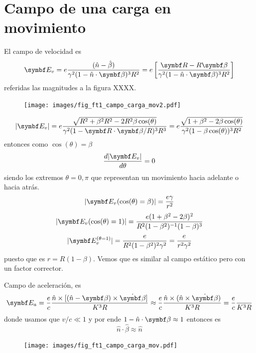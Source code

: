 \documentclass[10pt,oneside]{CBFT_book}
\begin{document}
\section{Campo de una carga en movimiento}

El campo de velocidad es 
\[
	\vb{E}_v = e \frac{(\hat{n}-\hat{\beta})}{\gamma^2(1-\hat{n}\cdot\vb{\beta})^3R^2} =
		e \left[ \frac{\vb{R}-R\vb{\beta}}{\gamma^2(1-\hat{n}\cdot\vb{\beta})^3R^2} \right]
\]
referidas las magnitudes a la figura XXXX.

\begin{figure}[htb]
	\begin{center}
	\texttt{[image: images/fig\_ft1\_campo\_carga\_mov2.pdf]}	 
	\end{center}
	\caption{}
\end{figure} 

\[
	|\vb{E}_v| = e\frac{\sqrt{ R^2 + \beta^2 R^2 - 2R^2 \beta \cos(\theta)}}
		{\gamma^2( 1 - \vb{R}\cdot\vb{\beta}/R)^3 R^3} =
		e\frac{\sqrt{ 1 + \beta^2 - 2 \beta \cos(\theta)}}
		{\gamma^2( 1 - \beta \cos(\theta))^3 R^2}
\]
entonces como $\cos(\theta) = \beta$
\[
	\dtot{ |\vb{E}_v| }{\theta}= 0
\]
siendo los extremos $\theta=0,\pi$ que representan un movimiento hacia adelante o hacia atrás.
\[
	|\vb{E}_v(\cos(\theta) = \beta)| = \frac{e\gamma}{r^2}
\]
\[
	|\vb{E}_v(\cos(\theta) = 1)| = \frac{e (1+\beta^2-2\beta)^2}{R^2(1-\beta^2)^{-1}(1-\beta)^3}
\]
\[
	|\vb{E}_v^{(\theta = 1)}| = \frac{e }{R^2(1-\beta^2)^2 \gamma^2} = \frac{e}{r^2 \gamma^2}
\]
puesto que es $r=R(1-\beta)$. Vemos que es similar al campo estático pero con un factor corrector.

Campo de aceleración, es
\[
	\vb{E}_a = \frac{e}{c} \frac{ \hat{n} \times [ (\hat{n}-\vb{\beta})\times \dot{\vb{\beta}} ]}{K^3 R} 
		\approx \frac{e}{c} \frac{ \hat{n} \times ( \hat{n} \times \dot{\vb{\beta}})}{K^3 R} 
		= \frac{e}{c} \frac{}{K^3 R}
\]
donde usamos que $v/c \ll 1$ y por ende $ 1 - \hat{n}\cdot\vb{\beta}\approx 1$ entonces es 
\[
	\hat{n} \cdot \hat{\beta} \approx \hat{n}
\]

\begin{figure}[htb]
	\begin{center}
	\texttt{[image: images/fig\_ft1\_campo\_carga\_mov.pdf]}	 
	\end{center}
	\caption{}
\end{figure}
\end{document}
